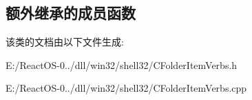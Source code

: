 \subsection*{额外继承的成员函数}


该类的文档由以下文件生成\+:\begin{DoxyCompactItemize}
\item 
E\+:/\+React\+O\+S-\/0../dll/win32/shell32/C\+Folder\+Item\+Verbs.\+h\item 
E\+:/\+React\+O\+S-\/0../dll/win32/shell32/C\+Folder\+Item\+Verbs.\+cpp\end{DoxyCompactItemize}
